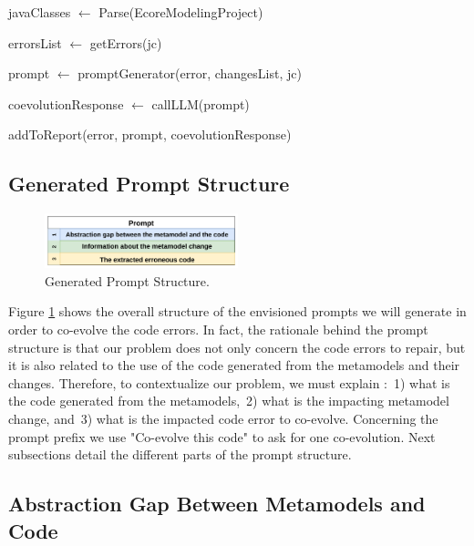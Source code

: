 \begin{algorithm2e}[t]
	\small
	\SetAlgoLined
	javaClasses $\leftarrow$ Parse(EcoreModelingProject)
	
	{
		errorsList $\leftarrow $ getErrors(jc)
		
		{
			prompt $\leftarrow$ promptGenerator(error, changesList, jc)
			
			coevolutionResponse $\leftarrow$ callLLM(prompt)
			
			addToReport(error, prompt, coevolutionResponse)
		}
	}
	
	
	\caption{\LLM Co-evolution}
	\label{algo:overallalgo}
\end{algorithm2e}

\subsection{Generated Prompt Structure}

\begin{figure}[t]
	\centering
	\includegraphics[width=0.5\textwidth]{./pics/chapter3pics/promptTemplate.png}
	\caption{Generated Prompt Structure.}
	\label{fig:promptstructure}
	\vspace{-5mm}
\end{figure}

Figure \ref{fig:promptstructure} shows the overall structure of the envisioned prompts we will generate in order to co-evolve the code errors. In fact, the rationale behind the prompt structure is that our problem does not only concern the code errors to repair, but it is also related to the use of the code generated from the metamodels and their changes. Therefore, to contextualize our problem, we must explain :~1) what is the code generated from the metamodels,~2) what is the impacting metamodel change, and~3) what is the impacted code error to co-evolve.  Concerning the prompt prefix we use "Co-evolve this code" to ask \LLM for one co-evolution. Next subsections detail the different parts of the prompt structure. 

\subsection{Abstraction Gap Between Metamodels and Code}

